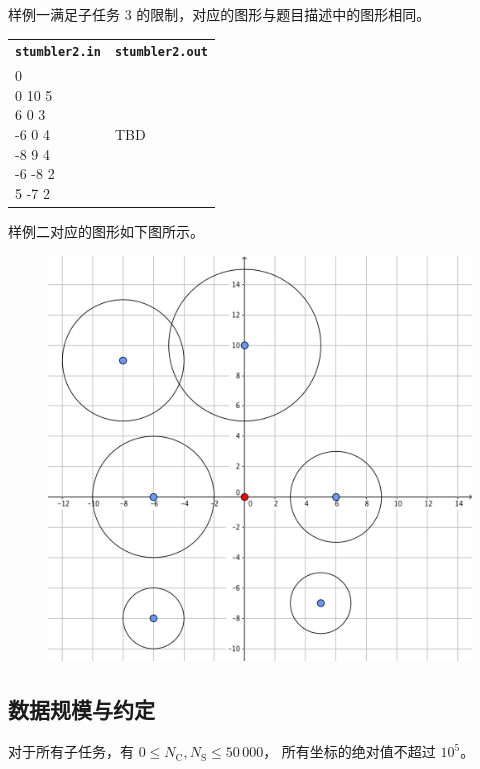 \documentclass[UTF8, 11pt, a4paper]{article}
\begin{document}
样例一满足子任务 3 的限制，对应的图形与题目描述中的图形相同。

\begin{table}[h]\centering
\begin{tabularx}{0.8 \textwidth}{|X|X|}
\hline
\texttt{\textbf{stumbler2.in}} & \texttt{\textbf{stumbler2.out}} \\ \hline
{\ttfamily
6 0\newline
0 10 5\newline
6 0 3\newline
-6 0 4\newline
-8 9 4\newline
-6 -8 2\newline
5 -7 2
} & {\ttfamily
TBD
}
\\ \hline
\end{tabularx}\end{table}

样例二对应的图形如下图所示。
\begin{figure}[h]\centering
\includegraphics[scale=0.22]{s2.png}
\end{figure}

\subsection*{数据规模与约定}
对于所有子任务，有 $0 \leq N_\mathrm{C}, N_\mathrm{S} \leq 50\,000$，%
所有坐标的绝对值不超过 $10^5$。
\end{document}

